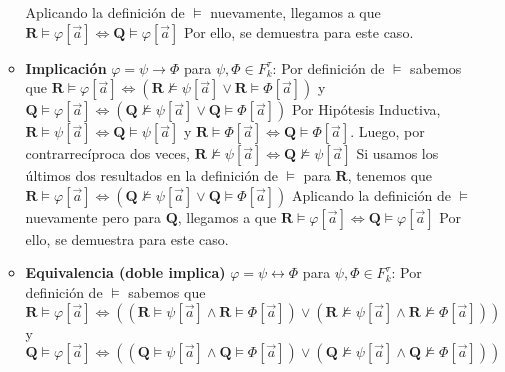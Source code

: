 \documentclass{article}
\begin{document}
\begin{itemize}
\begin{itemize}
                \hspace*{0.5cm} Aplicando la definición de $\vDash$ nuevamente, llegamos a que $\mathbf{R}\vDash\varphi[\vec{a}]\iff\mathbf{Q}\vDash\varphi[\vec{a}]$ \newline
                \hspace*{0.5cm} Por ello, se demuestra para este caso.
          \item \textbf{Implicación} $\varphi=\psi\to\Phi$ para $\psi,\Phi\in F^\tau_k$: \newline
                \hspace*{0.5cm} Por definición de $\vDash$ sabemos que $\mathbf{R}\vDash\varphi[\vec{a}]\iff(\mathbf{R}\not\vDash\psi[\vec{a}]\lor\mathbf{R}\vDash\Phi[\vec{a}])$ y $\mathbf{Q}\vDash\varphi[\vec{a}]\iff(\mathbf{Q}\not\vDash\psi[\vec{a}]\lor\mathbf{Q}\vDash\Phi[\vec{a}])$ \newline
                \hspace*{0.5cm} Por Hipótesis Inductiva, $\mathbf{R}\vDash\psi[\vec{a}]\iff\mathbf{Q}\vDash\psi[\vec{a}]$ y $\mathbf{R}\vDash\Phi[\vec{a}]\iff\mathbf{Q}\vDash\Phi[\vec{a}]$. \newline
                \hspace*{0.5cm} Luego, por contrarrecíproca dos veces, $\mathbf{R}\not\vDash\psi[\vec{a}]\iff\mathbf{Q}\not\vDash\psi[\vec{a}]$ \newline
                \hspace*{0.5cm} Si usamos los últimos dos resultados en la definición de $\vDash$ para $\mathbf{R}$, tenemos que $\mathbf{R}\vDash\varphi[\vec{a}]\iff(\mathbf{Q}\not\vDash\psi[\vec{a}]\lor\mathbf{Q}\vDash\Phi[\vec{a}])$ \newline
                \hspace*{0.5cm} Aplicando la definición de $\vDash$ nuevamente pero para $\mathbf{Q}$, llegamos a que $\mathbf{R}\vDash\varphi[\vec{a}]\iff\mathbf{Q}\vDash\varphi[\vec{a}]$ \newline
                \hspace*{0.5cm} Por ello, se demuestra para este caso.
          \item \textbf{Equivalencia (doble implica)} $\varphi=\psi\leftrightarrow\Phi$ para $\psi,\Phi\in F^\tau_k$: \newline
                \hspace*{0.5cm} Por definición de $\vDash$ sabemos que $\mathbf{R}\vDash\varphi[\vec{a}]\iff((\mathbf{R}\vDash\psi[\vec{a}]\land\mathbf{R}\vDash\Phi[\vec{a}])\lor(\mathbf{R}\not\vDash\psi[\vec{a}]\land\mathbf{R}\not\vDash\Phi[\vec{a}]))$ y $\mathbf{Q}\vDash\varphi[\vec{a}]\iff((\mathbf{Q}\vDash\psi[\vec{a}]\land\mathbf{Q}\vDash\Phi[\vec{a}])\lor(\mathbf{Q}\not\vDash\psi[\vec{a}]\land\mathbf{Q}\not\vDash\Phi[\vec{a}]))$ \newline

\end{itemize}
\end{itemize}
\end{document}
